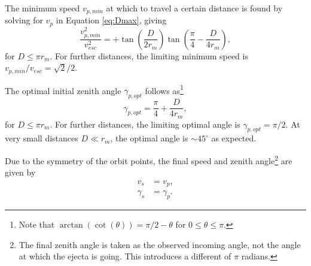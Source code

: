 \documentclass{article}
\begin{document}
The minimum speed $v_{p,min}$ at which to travel a certain distance is found by solving for $v_p$ in Equation \eqref{eq:Dmax}, giving
\begin{equation}\label{eq:vpmin_special}
\frac{v_{p,min}^2}{v_{esc}^2} = +\tan\left(\frac{D}{2r_m}\right)\tan\left(\frac{\pi}{4}- \frac{D}{4r_m}\right),
\end{equation}
for $D \le \pi r_m$. For further distances, the limiting minimum speed is $v_{p,min}/v_{esc} = \sqrt{2}/2$.

The optimal initial zenith angle $\gamma_{p,opt}$ follows as\footnote{Note that $\arctan(\cot(\theta)) = \pi/2 - \theta$ for $0 \le \theta \le \pi$.}
\begin{equation}
\gamma_{p,opt} = \frac{\pi}{4} + \frac{D}{4r_m},
\end{equation}
for $D \le \pi r_m$. For further distances, the limiting optimal angle is $\gamma_{p,opt} = \pi/2$. At very small distances $D \ll r_m$, the optimal angle is $\sim 45^\circ$ as expected.

Due to the symmetry of the orbit points, the final speed and zenith angle\footnote{The final zenith angle is taken as the observed incoming angle, not the angle at which the ejecta is going. This introduces a different of $\pi$ radians.} are given by
\begin{align}
v_s &= v_p,\\
\gamma_s &= \gamma_p.
\end{align}

\clearpage
{}
\end{document}
